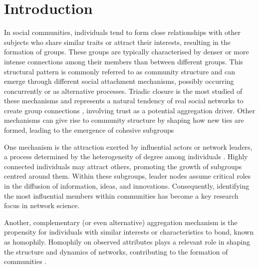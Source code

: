 \documentclass[11pt]{article}
\begin{document}
\clearpage

\section{Introduction}

In social communities, individuals tend to form close relationships with other subjects who share similar traits or attract their interests, resulting in the formation of groups. These groups are typically characterised by denser or more intense connections among their members than between different groups. This structural pattern is commonly referred to as community structure \citep{Newman2004FindingNetworks} and can emerge through different social attachment mechanisms, possibly occurring concurrently or as alternative processes. Triadic closure is the most studied of these mechanisms and represents a natural tendency of real social networks to create group connections \citep{Bianconi2014TriadicCA}, involving trust as a potential aggregation driver. Other mechanisms can give rise to community structure by shaping how new ties are formed, leading to the emergence of cohesive subgroups

One mechanism is the attraction exerted by influential actors or network leaders, a process determined by the heterogeneity of degree among individuals \citep{Perc2014TheData}. Highly connected individuals may attract others, promoting the growth of subgroups centred around them.
Within these subgroups, leader nodes assume critical roles in the diffusion of information, ideas, and innovations. %
Consequently, identifying the most influential members within communities has become a key research focus in network science. 

Another, complementary (or even alternative) aggregation mechanism is the propensity for individuals with similar interests or characteristics to bond, known as homophily. Homophily on observed attributes plays a relevant role in shaping the structure and dynamics of networks, contributing to the formation of communities \citep{Mcpherson2001BIRDSNetworks}. %
\end{document}
